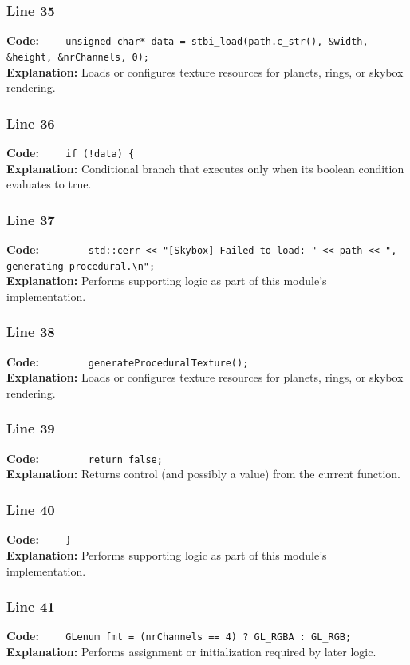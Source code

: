 \documentclass[11pt,a4paper]{article}
\begin{document}
\subsubsection*{Line 35}
\textbf{Code:} \verb|    unsigned char* data = stbi_load(path.c_str(), &width, &height, &nrChannels, 0);|\\
\textbf{Explanation:} Loads or configures texture resources for planets, rings, or skybox rendering.

\subsubsection*{Line 36}
\textbf{Code:} \verb|    if (!data) {|\\
\textbf{Explanation:} Conditional branch that executes only when its boolean condition evaluates to true.

\subsubsection*{Line 37}
\textbf{Code:} \verb|        std::cerr << "[Skybox] Failed to load: " << path << ", generating procedural.\n";|\\
\textbf{Explanation:} Performs supporting logic as part of this module's implementation.

\subsubsection*{Line 38}
\textbf{Code:} \verb|        generateProceduralTexture();|\\
\textbf{Explanation:} Loads or configures texture resources for planets, rings, or skybox rendering.

\subsubsection*{Line 39}
\textbf{Code:} \verb|        return false;|\\
\textbf{Explanation:} Returns control (and possibly a value) from the current function.

\subsubsection*{Line 40}
\textbf{Code:} \verb|    }|\\
\textbf{Explanation:} Performs supporting logic as part of this module's implementation.

\subsubsection*{Line 41}
\textbf{Code:} \verb|    GLenum fmt = (nrChannels == 4) ? GL_RGBA : GL_RGB;|\\
\textbf{Explanation:} Performs assignment or initialization required by later logic.
\end{document}
